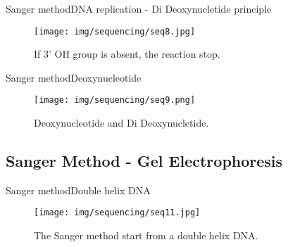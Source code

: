 \documentclass[10pt]{beamer}
\newcommand{\1}{
	\setbeamertemplate{background}{
		\texttt{[image: img/1]}
		\tikz[overlay] \fill[fill opacity=0.75,fill=white] (0,0) rectangle (-\paperwidth,\paperheight);
	}
}
\begin{document}
\begin{frame}{Sanger method}{DNA replication - Di Deoxynucletide principle}
	\begin{figure}[]
		\centering
		\texttt{[image: img/sequencing/seq8.jpg]}
		\label{img:mot2}
		\caption{If 3' OH group is absent, the reaction stop.}
	\end{figure}
\end{frame}

\begin{frame}{Sanger method}{Deoxynucleotide}
	\begin{figure}[]
		\centering
		\texttt{[image: img/sequencing/seq9.png]}
		\label{img:mot2}
		\caption{Deoxynucleotide and Di Deoxynucletide.}
	\end{figure}
\end{frame}

\subsection{Sanger Method - Gel Electrophoresis}

\begin{frame}{Sanger method}{Double helix DNA}
	\begin{figure}[]
		\centering
		\texttt{[image: img/sequencing/seq11.jpg]}
		\label{img:mot2}
		\caption{The Sanger method start from a double helix DNA.}
	\end{figure}
\end{frame}
\end{document}

